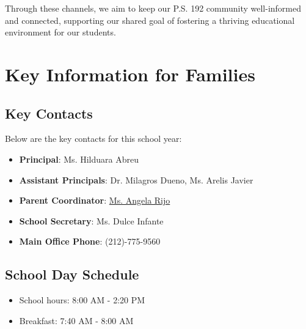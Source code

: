\documentclass[11pt]{article}
\begin{document}
Through these channels, we aim to keep our P.S. 192 community well-informed and connected, supporting our shared goal of fostering a thriving educational environment for our students.

\section{Key Information for Families}
\label{sec:org1ebff2b}
\subsection{Key Contacts}
\label{sec:orgd46750f}
Below are the key contacts for this school year:

\begin{itemize}
\item \textbf{\textbf{Principal}}: Ms. Hilduara Abreu
\item \textbf{\textbf{Assistant Principals}}: Dr. Milagros Dueno, Ms. Arelis Javier
\item \textbf{\textbf{Parent Coordinator}}: \href{https://www.ps192.org/angela}{Ms. Angela Rijo}
\item \textbf{\textbf{School Secretary}}: Ms. Dulce Infante
\item \textbf{\textbf{Main Office Phone}}: (212)-775-9560
\end{itemize}

\subsection{School Day Schedule}
\label{sec:org3dfe168}
\begin{itemize}
\item School hours: 8:00 AM - 2:20 PM
\item Breakfast: 7:40 AM - 8:00 AM
\end{itemize}
\end{document}
